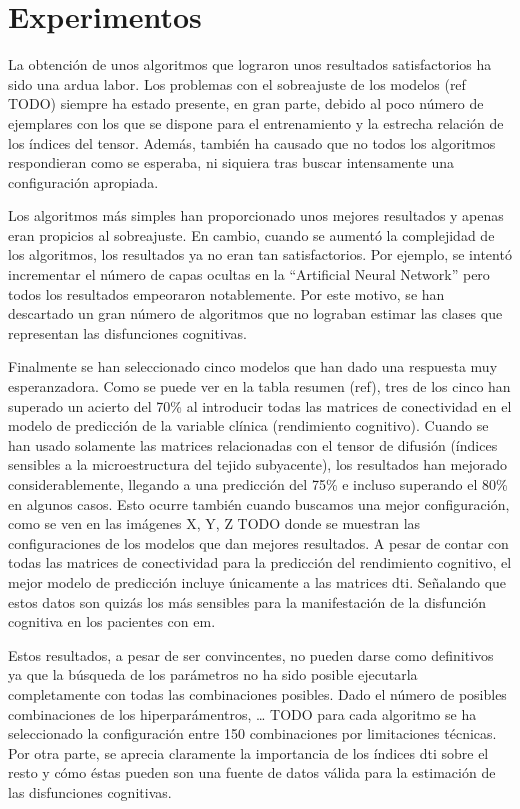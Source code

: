 
\section{Experimentos}
La obtención de unos algoritmos que lograron unos resultados satisfactorios ha sido una ardua labor. Los problemas con el sobreajuste de los modelos (ref TODO) siempre ha estado presente, en gran parte, debido al poco número de ejemplares con los que se dispone para el entrenamiento y la estrecha relación de los índices del tensor. Además, también ha causado que no todos los algoritmos respondieran  como se esperaba, ni siquiera tras buscar intensamente una configuración apropiada. 

Los algoritmos más simples han proporcionado unos mejores resultados y apenas eran propicios al sobreajuste. En cambio, cuando se aumentó la complejidad de los algoritmos, los resultados ya no eran tan satisfactorios. Por ejemplo, se intentó incrementar el número de capas ocultas en la ``Artificial Neural Network'' pero todos los resultados empeoraron notablemente. Por este motivo, se han descartado un gran número de algoritmos que no lograban estimar  las clases que representan las disfunciones cognitivas.

Finalmente se han seleccionado cinco modelos que han dado una respuesta muy esperanzadora. Como se puede ver en la tabla resumen (ref), tres de los cinco han superado un acierto del 70\% al introducir todas las matrices de conectividad en el modelo de predicción de  la variable clínica (rendimiento cognitivo). Cuando se han usado solamente las matrices relacionadas con el tensor de difusión (índices sensibles a la microestructura del tejido subyacente), los resultados han mejorado considerablemente, llegando a una predicción del 75\% e incluso superando el 80\% en algunos casos. Esto ocurre también cuando buscamos una mejor configuración, como se ven en las imágenes X, Y, Z TODO donde se muestran las configuraciones de los modelos que dan mejores resultados.  A pesar de contar con todas las matrices de conectividad para la predicción del rendimiento cognitivo, el mejor modelo de predicción incluye únicamente a las matrices \gls{dti}. Señalando que estos datos son quizás los más sensibles para la manifestación de la disfunción cognitiva en los pacientes con \gls{em}.

Estos resultados, a pesar de ser convincentes, no pueden darse como definitivos ya que la búsqueda de los parámetros no ha sido posible ejecutarla completamente con todas las combinaciones posibles. Dado el número de posibles combinaciones de los hiperparámentros, … TODO para cada algoritmo se ha seleccionado la configuración entre 150 combinaciones por limitaciones técnicas. Por otra parte, se aprecia claramente la importancia de los índices \gls{dti} sobre el resto y cómo éstas pueden son una fuente de datos válida para la estimación de las disfunciones cognitivas.


